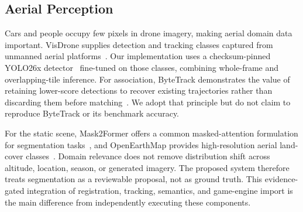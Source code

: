 \documentclass[letterpaper,conference]{IEEEtran}
\begin{document}
\subsection{Aerial Perception}
Cars and people occupy few pixels in drone imagery, making aerial domain data important. VisDrone supplies detection and tracking classes captured from unmanned aerial platforms~\cite{zhu2018visdrone}. Our implementation uses a checksum-pinned YOLO26x detector~\cite{jocher2026yolo26} fine-tuned on those classes, combining whole-frame and overlapping-tile inference. For association, ByteTrack demonstrates the value of retaining lower-score detections to recover existing trajectories rather than discarding them before matching~\cite{zhang2022bytetrack}. We adopt that principle but do not claim to reproduce ByteTrack or its benchmark accuracy.

For the static scene, Mask2Former offers a common masked-attention formulation for segmentation tasks~\cite{cheng2022mask2former}, and OpenEarthMap provides high-resolution aerial land-cover classes~\cite{xia2023openearthmap}. Domain relevance does not remove distribution shift across altitude, location, season, or generated imagery. The proposed system therefore treats segmentation as a reviewable proposal, not as ground truth. This evidence-gated integration of registration, tracking, semantics, and game-engine import is the main difference from independently executing these components.
\end{document}
